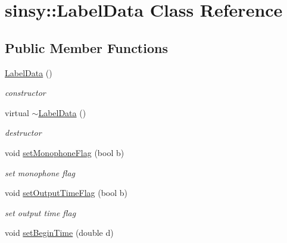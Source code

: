 \hypertarget{classsinsy_1_1LabelData}{\section{sinsy\-:\-:\-Label\-Data \-Class \-Reference}
\label{classsinsy_1_1LabelData}
}
\subsection*{\-Public \-Member \-Functions}
\begin{DoxyCompactItemize}
\item 
\hypertarget{classsinsy_1_1LabelData_a68573aaeba9e7e5d2d98bfd9fdb1bcc8}{\hyperlink{classsinsy_1_1LabelData_a68573aaeba9e7e5d2d98bfd9fdb1bcc8}{\-Label\-Data} ()}\label{classsinsy_1_1LabelData_a68573aaeba9e7e5d2d98bfd9fdb1bcc8}

\begin{DoxyCompactList}\small\item\em constructor \end{DoxyCompactList}\item 
\hypertarget{classsinsy_1_1LabelData_a9b33df6f235f7e43eac701e3ff4b5260}{virtual \hyperlink{classsinsy_1_1LabelData_a9b33df6f235f7e43eac701e3ff4b5260}{$\sim$\-Label\-Data} ()}\label{classsinsy_1_1LabelData_a9b33df6f235f7e43eac701e3ff4b5260}

\begin{DoxyCompactList}\small\item\em destructor \end{DoxyCompactList}\item 
\hypertarget{classsinsy_1_1LabelData_a55b78f427ad14ef9a7d6a16f8e0db04d}{void \hyperlink{classsinsy_1_1LabelData_a55b78f427ad14ef9a7d6a16f8e0db04d}{set\-Monophone\-Flag} (bool b)}\label{classsinsy_1_1LabelData_a55b78f427ad14ef9a7d6a16f8e0db04d}

\begin{DoxyCompactList}\small\item\em set monophone flag \end{DoxyCompactList}\item 
void \hyperlink{classsinsy_1_1LabelData_a17f2cfa54ff494875c2ea8f882515dca}{set\-Output\-Time\-Flag} (bool b)
\begin{DoxyCompactList}\small\item\em set output time flag \end{DoxyCompactList}\item 
\hypertarget{classsinsy_1_1LabelData_a16f6284914f7d1ce0dd47363d9cd0c96}{void \hyperlink{classsinsy_1_1LabelData_a16f6284914f7d1ce0dd47363d9cd0c96}{set\-Begin\-Time} (double d)}\label{classsinsy_1_1LabelData_a16f6284914f7d1ce0dd47363d9cd0c96}


\end{DoxyCompactItemize}
